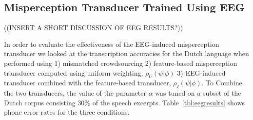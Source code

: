 \subsection{Misperception Transducer Trained Using EEG}
\label{ssec:eeg}

((INSERT A SHORT DISCUSSION OF EEG RESULTS?))

In order to evaluate the effectiveness of the EEG-induced misperception transducer we looked at the transcription accuracies for the Dutch language when performed using 1) mismatched crowdsourcing 2) feature-based misperception transducer computed using uniform weighting, $\rho_U(\psi|\phi)$ 3) EEG-induced transducer combined with the feature-based transducer, $\rho_I(\psi|\phi)$. To Combine the two transducers, the value of the parameter $\alpha$ was tuned on a subset of the Dutch corpus consisting $30\%$ of the speech excerpts. Table~\ref{tbl:eegresults} shows phone error rates for the three conditions.

